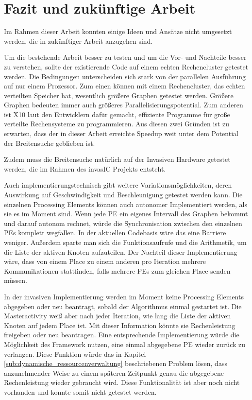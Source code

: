 \chapter{Fazit und zukünftige Arbeit} %
\label{cha:fazit_und_zuk_nftige_arbeit}

Im Rahmen dieser Arbeit konnten einige Ideen und Ansätze nicht umgesetzt werden, die in zukünftiger Arbeit anzugehen sind.

Um die bestehende Arbeit besser zu testen und um die Vor- und Nachteile besser zu verstehen, sollte der existierende Code auf einem echten Rechencluster getestet werden. Die Bedingungen unterscheiden sich stark von der parallelen Ausführung auf nur einem Prozessor. Zum einen können mit einem Rechencluster, das echten verteilten Speicher hat, wesentlich größere Graphen getestet werden. Größere Graphen bedeuten immer auch größeres Parallelisierungspotential. Zum anderen ist X10 laut den Entwicklern dafür gemacht, effiziente Programme für große verteilte Rechensysteme zu programmieren. Aus diesen zwei Gründen ist zu erwarten, dass der in dieser Arbeit erreichte Speedup weit unter dem Potential der Breitensuche geblieben ist. 

Zudem muss die Breitensuche natürlich auf der Invasiven Hardware getestet werden, die im Rahmen des invasIC Projekts entsteht.

Auch implementierungstechnisch gibt weitere Variationsmöglichkeiten, deren Auswirkung auf Geschwindigkeit und Beschleunigung getestet werden kann. Die einzelnen Processing Elements können auch autonomer Implementiert werden, als sie es im Moment sind. Wenn jede PE ein eigenes Intervall des Graphen bekommt und darauf autonom rechnet, würde die Synchronisation zwischen den einzelnen PEs komplett wegfallen. In der aktuellen Codebasis wäre das eine Barriere weniger. Außerdem sparte man sich die Funktionsaufrufe und die Arithmetik, um die Liste der aktiven Knoten aufzuteilen. Der Nachteil dieser Implementierung wäre, dass von einem Place zu einem anderen pro Iteration mehrere Kommunikationen stattfinden, falls mehrere PEs zum gleichen Place senden müssen. 

In der invasiven Implementierung werden im Moment keine Processing Elements abgegeben oder neu beantragt, sobald der Algorithmus einmal gestartet ist. Die Masteractivity weiß aber nach jeder Iteration, wie lang die Liste der aktiven Knoten auf jedem Place ist. Mit dieser Information könnte sie Rechenleistung freigeben oder neu beantragen. Eine entsprechende Implementierung würde die Möglichkeit des Framework nutzen, eine einmal abgegebene PE wieder zurück zu verlangen. Diese Funktion würde das in Kapitel \ref{sub:dynamische_ressourcenverwaltung} beschriebenen Problem lösen, dass anzunehmender Weise zu einem späteren Zeitpunkt genau die abgegebene Rechenleistung wieder gebraucht wird. Diese Funktionalität ist aber noch nicht vorhanden und konnte somit nicht getestet werden. 

